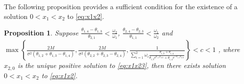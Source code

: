 \documentclass[11pt,reqno]{article}%
\newtheorem{proposition}[theorem]{Proposition}
\numberwithin{equation}{section}
\begin{document}
The following proposition provides a sufficient condition for the existence of a solution $0<x_1<x_2$ to \eqref{eq:x1x2}.

\begin{proposition}\label{suff}
Suppose $\frac{\theta_{1,4}-\theta_{1,3}}{\theta_{2,1}}<\frac{\omega_2}{\omega_1}$, $\frac{\theta_{2,4}-\theta_{2,3}}{\theta_{1,1}}<\frac{\omega_1}{\omega_2}$  and\\ $\max\left\{\frac{2M}{\sigma^2(\theta_{1,2}+\theta_{1,3}-\theta_{1,4})},\frac{2M}{\sigma^2(\theta_{2,2}+\theta_{2,3}-\theta_{2,4})},\frac{1}{\sum\limits_{i=1}^{2}\omega_i\frac{\theta_{i,3}+\theta_{i,4}}{\theta_{i,3} \mathrm{e}^{\theta_{i,3}x_{2,0}}+\theta_{i,4}\mathrm{e}^{-\theta_{i,4}x_{2,0}}}}\right\}<c<1$	, where $x_{2,0}$ is the unique positive solution to \eqref{eq:x1x23}, then there exists solution $0<x_1<x_2$ to \eqref{eq:x1x2}.	
\end{proposition}
\end{document}
